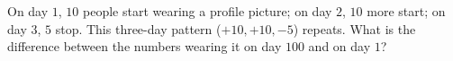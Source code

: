 On day $1$, $10$ people start wearing a profile picture; on day $2$, $10$ more start; on day $3$, $5$ stop. This three-day pattern ($+10,+10,-5$) repeats. What is the difference between the numbers wearing it on day $100$ and on day $1$?
